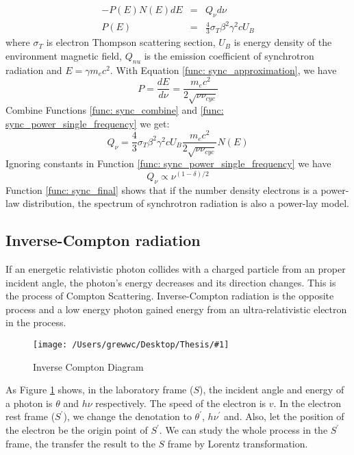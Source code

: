 \documentclass[12pt]{report}
\newcommand{\singleFig}[3]{
  \begin{figure}[!ht]
    \centering
    \texttt{[image: /Users/grewwc/Desktop/Thesis/\#1]}
    \caption{#3}
    \label{fig: #1}
  \end{figure}
}
\begin{document}
            \begin{eqnarray}
              \label{func: sync_power_single_frequency}
              -P\left(E\right)N\left(E\right)dE &=& Q_{\nu} d\nu\\
              P\left(E\right) &=& \frac{4}{3} \sigma_{T} \beta^2 \gamma^2 c U_B
            \end{eqnarray} 
            where $\sigma_{T}$ is electron Thompson scattering section, $U_B$ is energy 
            density of the environment magnetic field,  $Q_{nu}$ is the emission coefficient 
            of synchrotron radiation and $E=\gamma m_e c^2$. With Equation 
            \ref{func: sync_approximation}, we have
            \begin{equation}
              \label{func: sync_combine}
              P = \frac{dE}{d\nu} = \frac{m_e c^2}{2\sqrt{\nu \nu_{cyc}}}
            \end{equation}
            Combine Functions \ref{func: sync_combine} and 
            \ref{func: sync_power_single_frequency} we get:
            \begin{equation}
              Q_{\nu} = \frac{4}{3} \sigma_{T} \beta^2 \gamma^2 c U_B \frac{m_e c^2}{2\sqrt{\nu \nu_{cyc}}} N\left(E\right)
            \end{equation}
            Ignoring constants in Function \ref{func: sync_power_single_frequency} we have 
            \begin{equation}
              \label{func: sync_final}
              Q_{\nu} \propto \nu^{(1-\delta)/2}
            \end{equation}
            Function \ref{func: sync_final} shows that if the number density electrons is 
            a power-law distribution, the spectrum of synchrotron radiation is also a 
            power-lay model.  
            
          \subsection{Inverse-Compton radiation}
            If an energetic relativistic photon collides with a charged particle from an 
            proper incident angle, the photon's energy decreases and its direction changes. 
            This is the process of Compton Scattering. Inverse-Compton radiation is the 
            opposite process and a low energy photon gained energy from an ultra-relativistic 
            electron in the process. 

            \singleFig{inverse_compton}{0.45}{Inverse Compton Diagram}
            As Figure \ref{fig: inverse_compton} shows, in the laboratory frame ($S$), the 
            incident angle and energy of a photon is $\theta$ and $h \nu$ respectively. 
            The speed of the electron is $v$. In the electron rest frame ($S^{\prime}$), 
            we change the denotation to $\theta^{\prime}$, $h \nu^{\prime}$ and. Also, let 
            the position of the electron be the origin point of $S^{\prime}$. We can study 
            the whole process in the $S^{\prime}$ frame, the transfer the result to the $S$ 
            frame by Lorentz transformation. 
\end{document}
